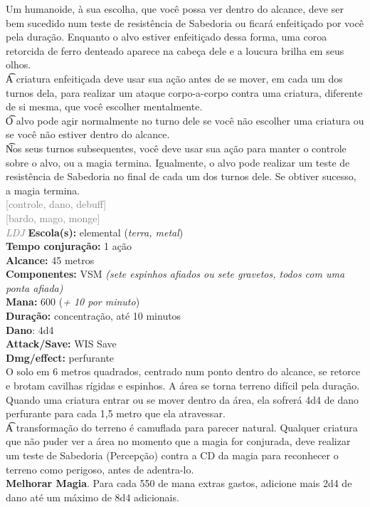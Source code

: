 \documentclass{RPG_Adventure}[2021/10/20]
\begin{document}
{\normalsize Um humanoide, à sua escolha, que você possa ver dentro do alcance, deve ser bem sucedido num teste de resistência de Sabedoria ou ficará enfeitiçado por você pela duração. Enquanto o alvo estiver enfeitiçado dessa forma, uma coroa retorcida de ferro denteado aparece na cabeça dele e a loucura brilha em seus olhos.\\\t A criatura enfeitiçada deve usar sua ação antes de se mover, em cada um dos turnos dela, para realizar um ataque corpo-a-corpo contra uma criatura, diferente de si mesma, que você escolher mentalmente.\\\t O alvo pode agir normalmente no turno dele se você não escolher uma criatura ou se você não estiver dentro do alcance.\\\t Nos seus turnos subsequentes, você deve usar sua ação para manter o controle sobre o alvo, ou a magia termina. Igualmente, o alvo pode realizar um teste de resistência de Sabedoria no final de cada um dos turnos dele. Se obtiver sucesso, a magia termina.\\}
{\scriptsize \textcolor{gray}{[controle, dano, debuff]\\}}
{\scriptsize \textcolor{gray}{[bardo, mago, monge]\\}}
{\tiny \textcolor{gray}{\textit{LDJ}}}\jump{}
{\small \t \textbf{Escola(s):} elemental (\textit{terra, metal})\\\t \textbf{Tempo conjuração:} 1 ação\\\t \textbf{Alcance:} 45 metros\\\t \textbf{Componentes:} VSM \textit{(sete espinhos afiados ou sete gravetos, todos com uma ponta afiada)}\\\t \textbf{Mana:} 600 (\textit{+ 10 por minuto})\\\t \textbf{Duração:} concentração, até 10 minutos\\\t \textbf{Dano}: 4d4\\\t \textbf{Attack/Save:} WIS Save\\\t \textbf{Dmg/effect:} perfurante\\}
{\normalsize O solo em 6 metros quadrados, centrado num ponto dentro do alcance, se retorce e brotam cavilhas rígidas e espinhos. A área se torna terreno difícil pela duração. Quando uma criatura entrar ou se mover dentro da área, ela sofrerá 4d4 de dano perfurante para cada 1,5 metro que ela atravessar.\\\t A transformação do terreno é camuflada para parecer natural. Qualquer criatura que não puder ver a área no momento que a magia for conjurada, deve realizar um teste de Sabedoria (Percepção) contra a CD da magia para reconhecer o terreno como perigoso, antes de adentra-lo.\\\t \textbf{Melhorar Magia}. Para cada 550 de mana extras gastos, adicione mais 2d4 de dano até um máximo de 8d4 adicionais.\\}
\end{document}
